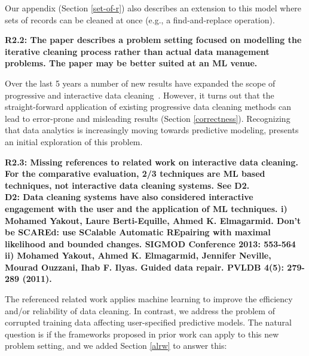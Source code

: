 Our appendix (Section \ref{set-of-r}) also describes an extension to this model where sets of records can be cleaned at once (e.g., a find-and-replace operation).

\vspace{0.5em}

\noindent\textbf{R2.2: The paper describes a problem setting focused on modelling the iterative cleaning process rather than actual data management problems. The paper may be better suited at an ML venue.}

Over the last 5 years a number of new results have expanded the scope of progressive and interactive data cleaning~\cite{mayfield2010eracer, DBLP:journals/pvldb/YakoutENOI11, yakout2013don, altowim2014progressive, whang2014incremental, papenbrock2015progressive, gruenheid2014incremental}.
However,  it turns out that the straight-forward application of existing progressive data cleaning methods can lead to error-prone and misleading results (Section \ref{correctness}).
Recognizing that data analytics is increasingly moving towards predictive modeling, \sys presents an initial exploration of this problem.  

\vspace{0.5em}

\noindent\textbf{R2.3: Missing references to related work on interactive data cleaning. For the comparative evaluation, 2/3 techniques are ML based techniques, not interactive data cleaning systems. See D2.\\
D2: Data cleaning systems have also considered interactive engagement with the user and the application of ML techniques. 
i) Mohamed Yakout, Laure Berti-Equille, Ahmed K. Elmagarmid. Don't be SCAREd: use SCalable Automatic REpairing with maximal likelihood and bounded changes. SIGMOD Conference 2013: 553-564
ii) Mohamed Yakout, Ahmed K. Elmagarmid, Jennifer Neville, Mourad Ouzzani, Ihab F. Ilyas.
Guided data repair. PVLDB 4(5): 279-289 (2011).
}

The referenced related work applies machine learning to improve the efficiency and/or reliability of data cleaning.
In contrast, we address the problem of corrupted training data affecting user-specified predictive models. 
The natural question is if the frameworks proposed in prior work can apply to this new problem setting, and we added Section \ref{alrw} to answer this:

